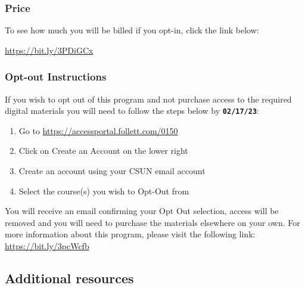 \documentclass[
  letterpaper,
  DIV=11,
  numbers=noendperiod]{scrartcl}
\providecommand{\tightlist}{%
  \setlength{\itemsep}{0pt}\setlength{\parskip}{0pt}}\usepackage{longtable,booktabs,array}
\begin{document}
\hypertarget{price}{%
\subsubsection{Price}\label{price}}

To see how much you will be billed if you opt-in, click the link below:

\url{https://bit.ly/3PDiGCx}

\hypertarget{opt-out-instructions}{%
\subsubsection{Opt-out Instructions}\label{opt-out-instructions}}

If you wish to opt out of this program and not purchase access to the
required digital materials you will need to follow the steps below by
\textbf{\texttt{02/17/23}}:

\begin{enumerate}
\def\labelenumi{\arabic{enumi}.}
\tightlist
\item
  Go to \url{https://accessportal.follett.com/0150}
\item
  Click on Create an Account on the lower right
\item
  Create an account using your CSUN email account
\item
  Select the course(s) you wish to Opt-Out from
\end{enumerate}

\begin{tcolorbox}[enhanced jigsaw, colbacktitle=quarto-callout-note-color!10!white, rightrule=.15mm, opacityback=0, colframe=quarto-callout-note-color-frame, leftrule=.75mm, breakable, bottomrule=.15mm, arc=.35mm, opacitybacktitle=0.6, title=\textcolor{quarto-callout-note-color}{\faInfo}\hspace{0.5em}{Note}, titlerule=0mm, toptitle=1mm, bottomtitle=1mm, left=2mm, toprule=.15mm, colback=white, coltitle=black]

You will receive an email confirming your Opt Out selection, access will
be removed and you will need to purchase the materials elsewhere on your
own. For more information about this program, please visit the following
link: \url{https://bit.ly/3pcWcfb}

\end{tcolorbox}

\hypertarget{additional-resources}{%
\subsection{Additional resources}\label{additional-resources}}
\end{document}
